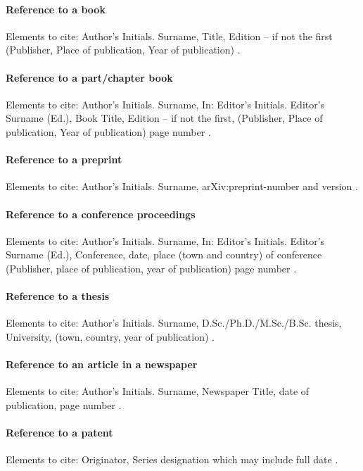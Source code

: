 \documentclass[USenglish,oneside,twocolumn]{article}
\begin{document}
\paragraph{Reference to a book}
Elements to cite:
Author's Initials. Surname,
Title,
Edition -- if not the first
(Publisher, Place of publication, Year of publication)
\cite{book}.


\paragraph{Reference to a part/chapter book}
Elements to cite:
Author's Initials. Surname,
In: Editor's Initials. Editor's Surname (Ed.),
Book Title,
Edition -- if not the first,
(Publisher, Place of publication, Year of publication)
page number \cite{chapter}.


\paragraph{Reference to a preprint}
Elements to cite:
Author's Initials. Surname,
arXiv:preprint-number and version \cite{arxiv-1,arxiv-2}.

\paragraph{Reference to a conference proceedings}
Elements to cite:
Author's Initials. Surname,
In: Editor's Initials. Editor's Surname (Ed.),
Conference,
date, place (town and country) of conference
(Publisher, place of publication, year of publication)
page number \cite{proceedings}.


\paragraph{Reference to a thesis}
Elements to cite:
Author's Initials. Surname,
D.Sc./Ph.D./M.Sc./B.Sc. thesis,
University,
(town, country, year of publication) \cite{thesis}.


\paragraph{Reference to an article in a newspaper}
Elements to cite:
Author's Initials. Surname,
Newspaper Title,
date of publication,
page number \cite{newspaper-1,newspaper-2}.


\paragraph{Reference to a patent}
Elements to cite:
Originator,
Series designation which may include full date \cite{patent}.
\end{document}
